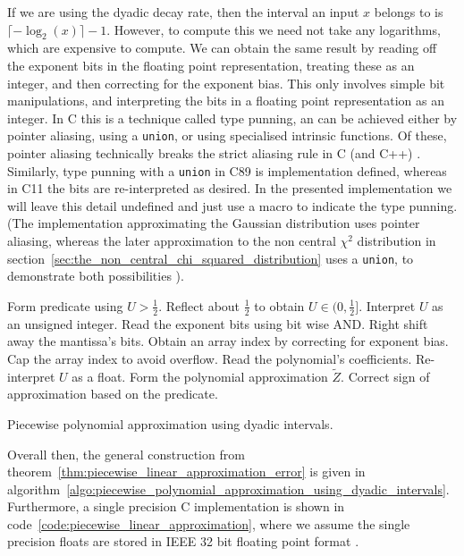 \documentclass[manuscript,review]{acmart}
\begin{document}
If we are using the dyadic decay rate, then the interval an input $ x $  belongs to is $ \lceil -{\log}_2(x) \rceil - 1 $. However, to compute this we need not take any logarithms, which are expensive to compute. We can obtain the same result by reading off the exponent bits in the floating point representation, treating these as an integer, and then correcting for the exponent bias.  This only involves simple bit manipulations, and interpreting the bits in a floating point representation as an integer. In C this is a technique called type punning, an can be achieved either by pointer aliasing, using a \texttt{union}, or using specialised intrinsic functions. Of these, pointer aliasing technically breaks the strict aliasing rule in C (and C++) \citep[6.5.2.3]{iso2012c11} \citep[pages~163--164]{stallman2020gcc}. Similarly, type punning with a \texttt{union} in C89 is implementation defined, whereas in C11 the bits are re-interpreted as desired. In the presented implementation we will leave this detail undefined and just use a macro to indicate the type punning. (The implementation approximating the Gaussian distribution uses pointer aliasing, whereas the later approximation to the non central $ \chi^2 $ distribution in section~\ref{sec:the_non_central_chi_squared_distribution} uses a \texttt{union}, to demonstrate both possibilities \citep{sheridan2020approximate_random}).

\begin{algorithm}[h!tb]
\DontPrintSemicolon
{}
Form predicate using $ U > \tfrac{1}{2} $.\;
Reflect about $ \tfrac{1}{2} $ to obtain $ U \in (0, \tfrac{1}{2}] $.\;
Interpret $ U $ as an unsigned integer.\;
Read the exponent bits using bit wise AND.\;
Right shift away the mantissa's bits.\;
Obtain an array index by correcting for exponent bias.\;
Cap the array index to avoid overflow.\;
Read the polynomial's coefficients.\;
Re-interpret $ U $ as a float.\;
Form the polynomial approximation $ \widetilde{Z} $.\;
Correct sign of approximation based on the predicate.\;
\caption{Piecewise polynomial approximation using dyadic intervals.}
\label{algo:piecewise_polynomial_approximation_using_dyadic_intervals}
\end{algorithm}

Overall then, the general construction from theorem~\ref{thm:piecewise_linear_approximation_error} is given in algorithm~\ref{algo:piecewise_polynomial_approximation_using_dyadic_intervals}. Furthermore, a single precision C implementation is shown in code~\ref{code:piecewise_linear_approximation}, where we assume the single precision floats are stored in IEEE 32 bit floating point format \citep{ieee2008ieee}. 
\end{document}
